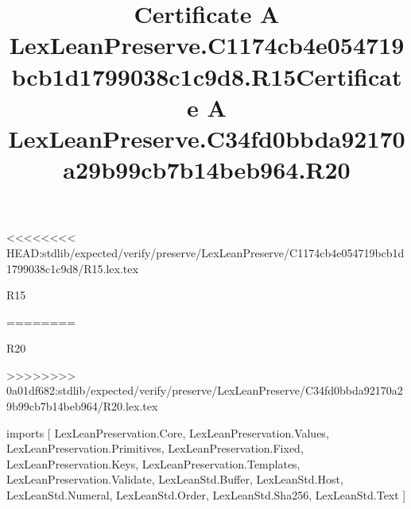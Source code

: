 <<<<<<<< HEAD:stdlib/expected/verify/preserve/LexLeanPreserve/C1174cb4e054719bcb1d1799038c1c9d8/R15.lex.tex
\begin{lexlean}{R15}
\title{Certificate A LexLeanPreserve.C1174cb4e054719bcb1d1799038c1c9d8.R15}
========
\begin{lexlean}{R20}
\title{Certificate A LexLeanPreserve.C34fd0bbda92170a29b99cb7b14beb964.R20}
>>>>>>>> 0a01df682:stdlib/expected/verify/preserve/LexLeanPreserve/C34fd0bbda92170a29b99cb7b14beb964/R20.lex.tex
\begin{coremodule}
imports [
  LexLeanPreservation.Core,
  LexLeanPreservation.Values,
  LexLeanPreservation.Primitives,
  LexLeanPreservation.Fixed,
  LexLeanPreservation.Keys,
  LexLeanPreservation.Templates,
  LexLeanPreservation.Validate,
  LexLeanStd.Buffer,
  LexLeanStd.Host,
  LexLeanStd.Numeral,
  LexLeanStd.Order,
  LexLeanStd.Sha256,
  LexLeanStd.Text
]


\end{coremodule}
\end{lexlean}
\end{lexlean}
